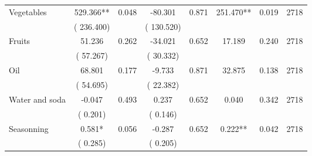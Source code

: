 \begin{tabular}{l*{7}{c}}
 Vegetables       &            529.366**       &        0.048  &            -80.301       &        0.871  &            251.470**       &              0.019 &  2718 \\ 
                       &       (     236.400)             &                               &       (     130.520)                     &                               &                                               &                                &                      \\ 

 Fruits       &             51.236       &        0.262  &            -34.021       &        0.652  &             17.189       &              0.240 &  2718 \\ 
                       &       (      57.267)             &                               &       (      30.332)                     &                               &                                               &                                &                      \\ 

 Oil       &             68.801       &        0.177  &             -9.733       &        0.871  &             32.875       &              0.138 &  2718 \\ 
                       &       (      54.695)             &                               &       (      22.382)                     &                               &                                               &                                &                      \\ 

 Water and soda       &             -0.047       &        0.493  &              0.237       &        0.652  &              0.040       &              0.342 &  2718 \\ 
                       &       (       0.201)             &                               &       (       0.146)                     &                               &                                               &                                &                      \\ 

 Seasonning       &              0.581*       &        0.056  &             -0.287       &        0.652  &              0.222**       &              0.042 &  2718 \\ 
                       &       (       0.285)             &                               &       (       0.205)                     &                               &                                               &                                &                      \\ 


\end{tabular}
